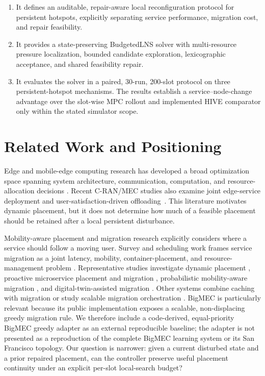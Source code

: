 \documentclass[preprint,12pt]{elsarticle}
\providecommand{\tightlist}{\setlength{\itemsep}{0pt}\setlength{\parskip}{0pt}}
\begin{document}
\begin{enumerate}
\def\labelenumi{\arabic{enumi}.}
\tightlist
\item
  It defines an auditable, repair-aware local reconfiguration protocol for persistent
  hotspots, explicitly separating service performance, migration cost,
  and repair feasibility.
\item
  It provides a state-preserving BudgetedLNS solver with multi-resource pressure
  localization, bounded candidate exploration, lexicographic acceptance,
  and shared feasibility repair.
\item
  It evaluates the solver in a paired, 30-run, 200-slot protocol on
  three persistent-hotspot mechanisms. The results establish a
  service--node-change advantage over the slot-wise MPC rollout and implemented HIVE
  comparator only within the stated simulator scope.
\end{enumerate}

\section{Related Work and Positioning}\label{related-work-and-positioning}

Edge and mobile-edge computing research has developed a broad
optimization space spanning system architecture, communication,
computation, and resource-allocation decisions
\citep{shi2016edge, mach2017mec, mao2017survey, abbas2018mec}. Recent
C-RAN/MEC studies also examine joint edge-service deployment and
user-satisfaction-driven offloading~\citep{pan2024joint,yang2024satisfaction}.
This
literature motivates dynamic placement, but it does not determine how
much of a feasible placement should be retained after a local persistent
disturbance.

Mobility-aware placement and migration research explicitly considers
where a service should follow a moving user. Survey and scheduling work
frames service migration as a joint latency, mobility,
container-placement, and resource-management problem
\citep{wang2018migration, oleghe2021migration}. Representative studies
investigate dynamic placement \citep{ouyang2018follow, zhao2020maesp},
proactive microservice placement and migration \citep{ray2020proactive},
probabilistic mobility-aware migration \citep{xu2021pdma}, and
digital-twin-assisted migration \citep{bozkaya2023dtmigration}. Other
systems combine caching with migration
\citep{li2021cachemigration, li2022dqnmigration} or study scalable
migration orchestration
\citep{brandherm2022bigmec,brandherm2024bigmecsoftware}. BigMEC is particularly
relevant because its public implementation exposes a scalable,
non-displacing greedy migration rule. We therefore include a code-derived,
equal-priority BigMEC greedy adapter as an external reproducible baseline;
the adapter is not presented as a reproduction of the complete BigMEC
learning system or its San Francisco topology. Our question is
narrower: given a current disturbed state and a prior repaired
placement, can the controller preserve useful placement continuity under
an explicit per-slot local-search budget?
\end{document}
